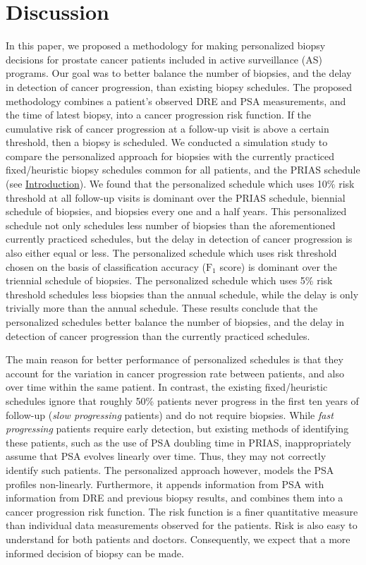 \section{Discussion}
\label{sec:discussion}
In this paper, we proposed a methodology for making personalized biopsy decisions for prostate cancer patients included in active surveillance (AS) programs. Our goal was to better balance the number of biopsies, and the delay in detection of cancer progression, than existing biopsy schedules. The proposed methodology combines a patient's observed DRE and PSA measurements, and the time of latest biopsy, into a cancer progression risk function. If the cumulative risk of cancer progression at a follow-up visit is above a certain threshold, then a biopsy is scheduled. We conducted a simulation study to compare the personalized approach for biopsies with the currently practiced fixed/heuristic biopsy schedules common for all patients, and the PRIAS schedule (see \hyperref[sec:introduction]{Introduction}). We found that the personalized schedule which uses 10\% risk threshold at all follow-up visits is dominant over the PRIAS schedule, biennial schedule of biopsies, and biopsies every one and a half years. This personalized schedule not only schedules less number of biopsies than the aforementioned currently practiced schedules, but the delay in detection of cancer progression is also either equal or less. The personalized schedule which uses risk threshold chosen on the basis of classification accuracy ($\mbox{F}_1$ score) is dominant over the triennial schedule of biopsies. The personalized schedule which uses 5\% risk threshold schedules less biopsies than the annual schedule, while the delay is only trivially more than the annual schedule. These results conclude that the personalized schedules better balance the number of biopsies, and the delay in detection of cancer progression than the currently practiced schedules.

The main reason for better performance of personalized schedules is that they account for the variation in cancer progression rate between patients, and also over time within the same patient. In contrast, the existing fixed/heuristic schedules ignore that roughly 50\% patients never progress in the first ten years of follow-up (\textit{slow progressing} patients) and do not require biopsies. While \textit{fast progressing} patients require early detection, but existing methods of identifying these patients, such as the use of PSA doubling time in PRIAS, inappropriately assume that PSA evolves linearly over time. Thus, they may not correctly identify such patients. The personalized approach however, models the PSA profiles non-linearly. Furthermore, it appends information from PSA with information from DRE and previous biopsy results, and combines them into a cancer progression risk function. The risk function is a finer quantitative measure than individual data measurements observed for the patients. Risk is also easy to understand for both patients and doctors. Consequently, we expect that a more informed decision of biopsy can be made. 

